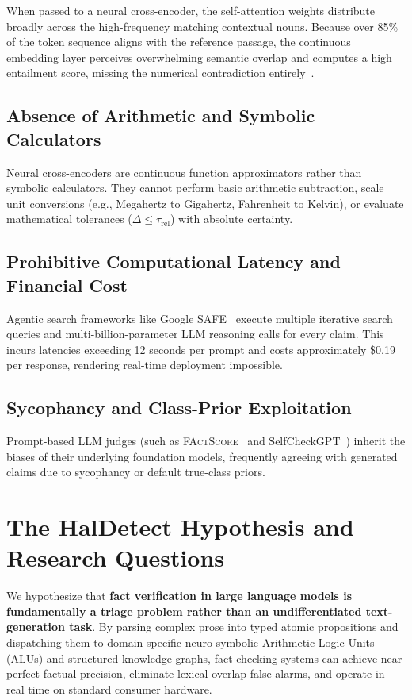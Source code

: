 When passed to a neural cross-encoder, the self-attention weights distribute broadly across the high-frequency matching contextual nouns. Because over 85\% of the token sequence aligns with the reference passage, the continuous embedding layer perceives overwhelming semantic overlap and computes a high entailment score, missing the numerical contradiction entirely~\cite{fisch2026finground}.

\subsection{Absence of Arithmetic and Symbolic Calculators}
Neural cross-encoders are continuous function approximators rather than symbolic calculators. They cannot perform basic arithmetic subtraction, scale unit conversions (e.g., Megahertz to Gigahertz, Fahrenheit to Kelvin), or evaluate mathematical tolerances ($\Delta \le \tau_{\text{rel}}$) with absolute certainty.

\subsection{Prohibitive Computational Latency and Financial Cost}
Agentic search frameworks like Google SAFE~\cite{wei2024safe} execute multiple iterative search queries and multi-billion-parameter LLM reasoning calls for every claim. This incurs latencies exceeding 12 seconds per prompt and costs approximately \$0.19 per response, rendering real-time deployment impossible.

\subsection{Sycophancy and Class-Prior Exploitation}
Prompt-based LLM judges (such as \textsc{FActScore}~\cite{min2023factscore} and SelfCheckGPT~\cite{manakul2023selfcheckgpt}) inherit the biases of their underlying foundation models, frequently agreeing with generated claims due to sycophancy or default true-class priors.

\section{The HalDetect Hypothesis and Research Questions}
\label{sec:hypothesis_rqs}

We hypothesize that \textbf{fact verification in large language models is fundamentally a triage problem rather than an undifferentiated text-generation task}. By parsing complex prose into typed atomic propositions and dispatching them to domain-specific neuro-symbolic Arithmetic Logic Units (ALUs) and structured knowledge graphs, fact-checking systems can achieve near-perfect factual precision, eliminate lexical overlap false alarms, and operate in real time on standard consumer hardware.

